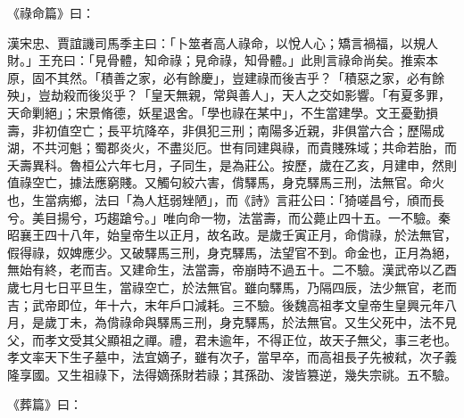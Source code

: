 \begin{pinyinscope}
 《祿命篇》曰：



 漢宋忠、賈誼譏司馬季主曰：「卜筮者高人祿命，以悅人心；矯言禍福，以規人財。」王充曰：「見骨體，知命祿；見命祿，知骨體。」此則言祿命尚矣。推索本原，固不其然。「積善之家，必有餘慶」，豈建祿而後吉乎？「積惡之家，必有餘殃」，豈劫殺而後災乎？「皇天無親，常與善人」，天人之交如影響。「有夏多罪，天命剿絕」；宋景脩德，妖星退舍。「學也祿在某中」，不生當建學。文王憂勤損壽，非初值空亡；長平坑降卒，非俱犯三刑；南陽多近親，非俱當六合；歷陽成湖，不共河魁；蜀郡炎火，不盡災厄。世有同建與祿，而貴賤殊域；共命若胎，而夭壽異科。魯桓公六年七月，子同生，是為莊公。按歷，歲在乙亥，月建申，然則值祿空亡，據法應窮賤。又觸句絞六害，偝驛馬，身克驛馬三刑，法無官。命火也，生當病鄉，法曰「為人尪弱矬陋」，而《詩》言莊公曰：「猗嗟昌兮，頎而長兮。美目揚兮，巧趨蹌兮。」唯向命一物，法當壽，而公薨止四十五。一不驗。秦昭襄王四十八年，始皇帝生以正月，故名政。是歲壬寅正月，命偝祿，於法無官，假得祿，奴婢應少。又破驛馬三刑，身克驛馬，法望官不到。命金也，正月為絕，無始有終，老而吉。又建命生，法當壽，帝崩時不過五十。二不驗。漢武帝以乙酉歲七月七日平旦生，當祿空亡，於法無官。雖向驛馬，乃隔四辰，法少無官，老而吉；武帝即位，年十六，末年戶口減耗。三不驗。後魏高祖孝文皇帝生皇興元年八月，是歲丁未，為偝祿命與驛馬三刑，身克驛馬，於法無官。又生父死中，法不見父，而孝文受其父顯祖之禪。禮，君未逾年，不得正位，故天子無父，事三老也。孝文率天下生子墓中，法宜嫡子，雖有次子，當早卒，而高祖長子先被弒，次子義隆享國。又生祖祿下，法得嫡孫財若祿；其孫劭、浚皆篡逆，幾失宗祧。五不驗。



 《葬篇》曰：




\end{pinyinscope}
